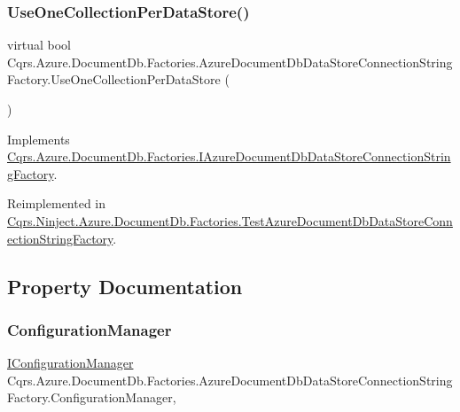 \subsubsection{\texorpdfstring{Use\+One\+Collection\+Per\+Data\+Store()}{UseOneCollectionPerDataStore()}}
{\footnotesize\ttfamily virtual bool Cqrs.\+Azure.\+Document\+Db.\+Factories.\+Azure\+Document\+Db\+Data\+Store\+Connection\+String\+Factory.\+Use\+One\+Collection\+Per\+Data\+Store (\begin{DoxyParamCaption}{ }\end{DoxyParamCaption})\hspace{0.3cm}{\ttfamily [virtual]}}



Implements \hyperlink{interfaceCqrs_1_1Azure_1_1DocumentDb_1_1Factories_1_1IAzureDocumentDbDataStoreConnectionStringFactory_afdb9a4c6d4ada68c58413909d65e3d1c}{Cqrs.\+Azure.\+Document\+Db.\+Factories.\+I\+Azure\+Document\+Db\+Data\+Store\+Connection\+String\+Factory}.



Reimplemented in \hyperlink{classCqrs_1_1Ninject_1_1Azure_1_1DocumentDb_1_1Factories_1_1TestAzureDocumentDbDataStoreConnectionStringFactory_a3f802b2e647584bb96fdcdb532a149bb}{Cqrs.\+Ninject.\+Azure.\+Document\+Db.\+Factories.\+Test\+Azure\+Document\+Db\+Data\+Store\+Connection\+String\+Factory}.



\subsection{Property Documentation}
\mbox{\label{classCqrs_1_1Azure_1_1DocumentDb_1_1Factories_1_1AzureDocumentDbDataStoreConnectionStringFactory_a7d0a40bb03e9e15306023bf97094cf60}} 
\subsubsection{\texorpdfstring{Configuration\+Manager}{ConfigurationManager}}
{\footnotesize\ttfamily \hyperlink{interfaceCqrs_1_1Configuration_1_1IConfigurationManager}{I\+Configuration\+Manager} Cqrs.\+Azure.\+Document\+Db.\+Factories.\+Azure\+Document\+Db\+Data\+Store\+Connection\+String\+Factory.\+Configuration\+Manager\hspace{0.3cm}{\ttfamily [get]}, {\ttfamily [protected]}}

